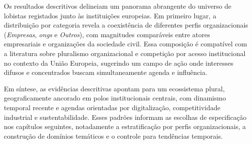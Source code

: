 Os resultados descritivos delineiam um panorama abrangente do universo de lobistas registados junto às instituições europeias. Em primeiro lugar, a distribuição por categoria revela a coexistência de diferentes perfis organizacionais (\textit{Empresas}, \textit{\acrshort{ong}s} e \textit{Outros}), com magnitudes comparáveis entre atores empresariais e organizações da sociedade civil. Essa composição é compatível com a literatura sobre pluralismo organizacional e competição por acesso institucional no contexto da União Europeia, sugerindo um campo de ação onde interesses difusos e concentrados buscam simultaneamente agenda e influência.

Em síntese, as evidências descritivas apontam para um ecossistema plural, geograficamente ancorado em polos institucionais centrais, com dinamismo temporal recente e agendas orientadas por digitalização, competitividade industrial e sustentabilidade. Esses padrões informam as escolhas de especificação nos capítulos seguintes, notadamente a estratificação por perfis organizacionais, a construção de domínios temáticos e o controle para tendências temporais.

